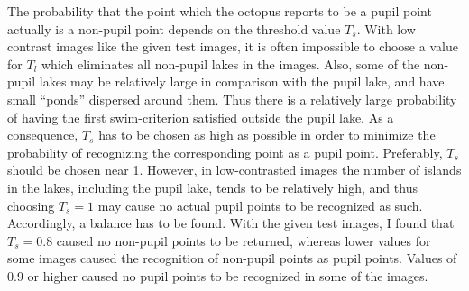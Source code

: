 The probability that the point which the octopus reports to be a pupil
point actually is a non-pupil point depends on the threshold value
$T_{s}$.  With low contrast images like the given test images, it is
often impossible to choose a value for $T_{l}$ which eliminates all
non-pupil lakes in the images.  Also, some of the non-pupil lakes may
be relatively large in comparison with the pupil lake, and have small
``ponds'' dispersed around them.  Thus there is a relatively large
probability of having the first swim-criterion satisfied outside the
pupil lake.  As a consequence, $T_{s}$ has to be chosen as high as
possible in order to minimize the probability of recognizing the
corresponding point as a pupil point.  Preferably, $T_{s}$ should be
chosen near 1.  However, in low-contrasted images the number of
islands in the lakes, including the pupil lake, tends to be relatively
high, and thus choosing $T_{s}=1$ may cause no actual pupil points to
be recognized as such.  Accordingly, a balance has to be found.  With
the given test images, I found that $T_{s}=0.8$ caused no non-pupil
points to be returned, whereas lower values for some images caused the
recognition of non-pupil points as pupil points.  Values of 0.9 or
higher caused no pupil points to be recognized in some of the images.

